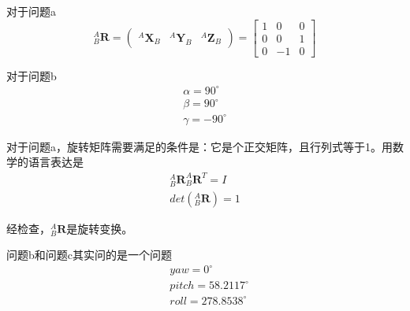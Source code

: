 \documentclass{homework}
\begin{document}
\question 

\begin{sol}
  对于问题a
  \[
    _B^A\mathbf{R} = \begin{pmatrix} ^A\mathbf{X}_B & ^A\mathbf{Y}_B & ^A\mathbf{Z}_B \end{pmatrix} = 
    \begin{bmatrix}
      1 & 0 & 0 \\
      0 & 0 & 1 \\
      0 & -1 & 0 
    \end{bmatrix}
  \]

  对于问题b
  \begin{align*}
    \alpha = 90^\circ \\
    \beta = 90^\circ \\
    \gamma = -90^\circ
  \end{align*}
  
\end{sol}

\question 

\begin{sol}
  对于问题a，旋转矩阵需要满足的条件是：它是个正交矩阵，且行列式等于1。用数学的语言表达是
  \begin{align*}
    _B^A\mathbf{R} _B^A\mathbf{R}^T = I \\
    det(_B^A\mathbf{R}) = 1
  \end{align*}

  经检查，$ _B^A\mathbf{R} $是旋转变换。

  问题b和问题c其实问的是一个问题
  \begin{align*}
    & yaw = 0^\circ \\
    & pitch = 58.2117^\circ \\
    & roll = 278.8538^\circ
  \end{align*}
  
\end{sol}

\question 
\end{document}
